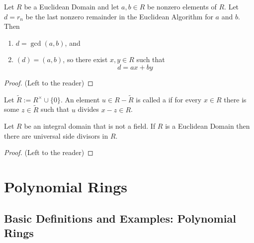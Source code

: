 \documentclass[12pt, a4paper, oneside, openright, titlepage]{book}
\begin{document}
\begin{thm}
    Let $R$ be a Euclidean Domain and let $a,b \in R$ be nonzero elements of $R$. Let $d = r_n$ be the last nonzero remainder in the Euclidean Algorithm for $a$ and $b$. Then \begin{enumerate}
        \item $d = \gcd(a,b)$, and 
        \item $(d) = (a,b)$, so there exist $x,y \in R$ such that \begin{equation}
                d = ax + by
        \end{equation}
    \end{enumerate}
\end{thm}
\begin{proof}
    (Left to the reader)
\end{proof}

\begin{defn}
    Let $\widetilde{R} := R^{\times}\cup \{0\}$. An element $u \in R - \widetilde{R}$ is called a  if for every $x \in R$ there is some $z \in \widetilde{R}$ such that $u$ divides $x-z \in R$.
\end{defn}


\begin{prop}
    Let $R$ be an integral domain that is not a field. If $R$ is a Euclidean Domain then there are universal side divisors in $R$.
\end{prop}
\begin{proof}
    (Left to the reader)
\end{proof}



\chapter{\textsection\textsection Polynomial Rings}

\section{\textsection Basic Definitions and Examples: Polynomial Rings}
\end{document}
